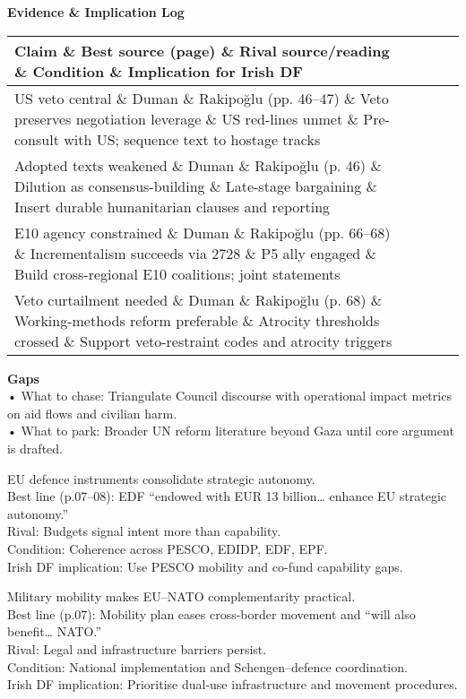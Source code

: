\textbf{Evidence \& Implication Log}
\begin{tabular}{p{3.2cm}p{4.2cm}p{3.6cm}p{3.2cm}p{4.2cm}}
	\textbf{Claim} \& \textbf{Best source (page)} \& \textbf{Rival source/reading} \& \textbf{Condition} \& \textbf{Implication for Irish DF}\\\hline
	US veto central \& Duman \& Rakipoğlu (pp. 46–47) \& Veto preserves negotiation leverage \& US red-lines unmet \& Pre-consult with US; sequence text to hostage tracks\\
	Adopted texts weakened \& Duman \& Rakipoğlu (p. 46) \& Dilution as consensus-building \& Late-stage bargaining \& Insert durable humanitarian clauses and reporting\\
	E10 agency constrained \& Duman \& Rakipoğlu (pp. 66–68) \& Incrementalism succeeds via 2728 \& P5 ally engaged \& Build cross-regional E10 coalitions; joint statements\\
	Veto curtailment needed \& Duman \& Rakipoğlu (p. 68) \& Working-methods reform preferable \& Atrocity thresholds crossed \& Support veto-restraint codes and atrocity triggers\\
\end{tabular}

\textbf{Gaps}\\
• What to chase: Triangulate Council discourse with operational impact metrics on aid flows and civilian harm.\\
• What to park: Broader UN reform literature beyond Gaza until core argument is drafted.


EU defence instruments consolidate strategic autonomy.\\
Best line (p.07–08): EDF “endowed with EUR 13 billion… enhance EU strategic autonomy.”\\
Rival: Budgets signal intent more than capability.\\
Condition: Coherence across PESCO, EDIDP, EDF, EPF.\\
Irish DF implication: Use PESCO mobility and co-fund capability gaps.

Military mobility makes EU–NATO complementarity practical.\\
Best line (p.07): Mobility plan eases cross-border movement and “will also benefit… NATO.”\\
Rival: Legal and infrastructure barriers persist.\\
Condition: National implementation and Schengen–defence coordination.\\
Irish DF implication: Prioritise dual-use infrastructure and movement procedures.

